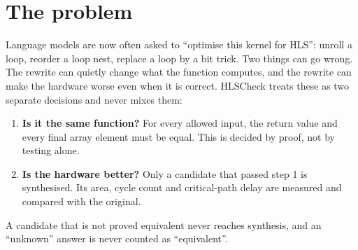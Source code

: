 \documentclass[10pt,a4paper]{article}
\begin{document}
\section{The problem}
Language models are now often asked to ``optimise this kernel for HLS'': unroll a loop, reorder a
loop nest, replace a loop by a bit trick. Two things can go wrong. The rewrite can quietly change what
the function computes, and the rewrite can make the hardware worse even when it is correct.
HLSCheck treats these as two separate decisions and never mixes them:
\begin{enumerate}
\item \textbf{Is it the same function?} For every allowed input, the return value and every final
array element must be equal. This is decided by proof, not by testing alone.
\item \textbf{Is the hardware better?} Only a candidate that passed step 1 is synthesised. Its area,
cycle count and critical-path delay are measured and compared with the original.
\end{enumerate}
A candidate that is not proved equivalent never reaches synthesis, and an ``unknown'' answer is never
counted as ``equivalent''.
\end{document}
